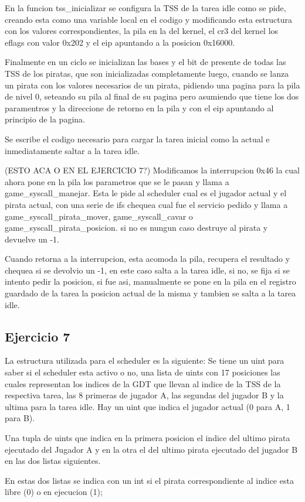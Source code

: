 En la funcion tss_inicializar se configura la TSS de la tarea idle como se pide, creando esta como una variable
local en el codigo y modificando esta estructura con los valores correspondientes, la pila en la del kernel, el
cr3 del kernel los eflags con valor 0x202 y el eip apuntando a la posicion 0x16000.

Finalmente en un ciclo se inicializan las bases y el bit de presente de todas las TSS de los piratas, que son inicializadas
completamente luego, cuando se lanza un pirata con los valores necesarios de un pirata, pidiendo una pagina para la pila
de nivel 0, seteando su pila al final de su pagina pero asumiendo que tiene los dos paramentros y la direccione
de retorno en la pila y con el eip apuntando al principio de la pagina.

Se escribe el codigo necesario para cargar la tarea inicial como la actual e inmediatamente saltar a la tarea idle.

(ESTO ACA O EN EL EJERCICIO 7?)
Modificamos la interrupcion 0x46 la cual ahora pone en la pila los parametros que se le pasan
y llama a game_syscall_manejar. Esta le pide al scheduler cual es el jugador actual y el pirata actual,
con una serie de ifs chequea cual fue el servicio pedido y llama a game_syscall_pirata_mover, game_syscall_cavar o
game_syscall_pirata_posicion. si no es nungun caso destruye al pirata y devuelve un -1.

Cuando retorna a la interrupcion, esta acomoda la pila, recupera el resultado y chequea si se devolvio un -1,
en este caso salta a la tarea idle, si no, se fija si se intento pedir la posicion, si fue asi, manualmente se
pone en la pila en el registro guardado de la tarea la posicion actual de la misma y tambien se salta a la tarea idle.



\subsection{Ejercicio 7}

La estructura utilizada para el scheduler es la siguiente:
  Se tiene un uint para saber si el scheduler esta activo o no, una lista de uints con 17 posiciones las cuales
  representan los indices de la GDT que llevan al indice de la TSS de la respectiva tarea, las 8 primeras de jugador A,
  las segundas del jugador B y la ultima para la tarea idle.
  Hay un uint que indica el jugador actual (0 para A, 1 para B).

Una tupla de uints que indica en la primera posicion el indice del ultimo pirata ejecutado del Jugador A y en la otra el del
ultimo pirata ejecutado del jugador B en las dos listas siguientes.

En estas dos listas se indica con un int si el pirata correspondiente al indice esta libre (0) o en ejecucion (1);
